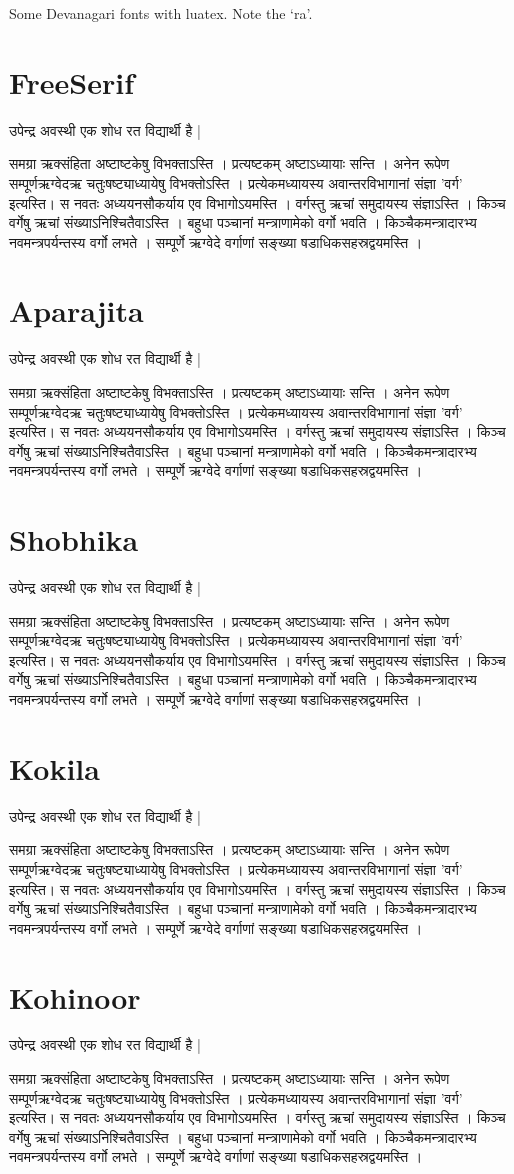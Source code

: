 \documentclass{article}
\newcommand\text{उपेन्द्र अवस्थी एक शोध रत विद्यार्थी है |%
\vskip3mm

समग्रा ऋक्संहिता अष्टाष्टकेषु विभक्ताऽस्ति । प्रत्यष्टकम् अष्टाऽध्यायाः
सन्ति । अनेन रूपेण सम्पूर्णऋग्वेदऋ चतुःषष्ट्याध्यायेषु विभक्तोऽस्ति ।
प्रत्येकमध्यायस्य अवान्तरविभागानां संज्ञा 'वर्ग' इत्यस्ति। स नवतः
अध्ययनसौकर्याय एव विभागोऽयमस्ति । वर्गस्तु ऋचां समुदायस्य संज्ञाऽस्ति ।
किञ्च वर्गेषु ऋचां संख्याऽनिश्चितैवाऽस्ति । बहुधा पञ्चानां
मन्त्राणामेको वर्गो भवति । किञ्चैकमन्त्रादारभ्य नवमन्त्रपर्यन्तस्य
वर्गो लभते । सम्पूर्णे ऋग्वेदे वर्गाणां सङ्ख्या षडाधिकसहस्रद्वयमस्ति ।}
\begin{document}
\raggedright

Some Devanagari fonts with luatex. Note the ‘ra’.

\section{FreeSerif}\fsfamily\text

\section{Aparajita}\apfamily\text

\section{Shobhika}\sbfamily\text

\section{Kokila}\kkfamily\text

\section{Kohinoor}\khfamily\text
\end{document}
